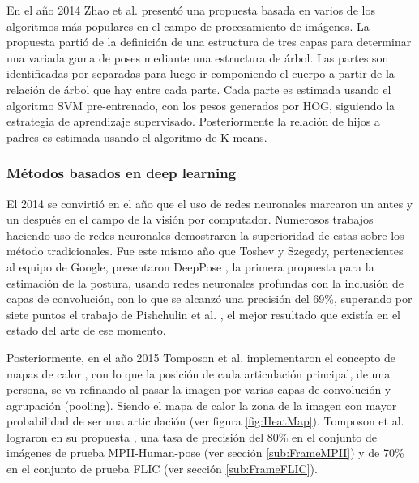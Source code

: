         En el año 2014 Zhao et al. \cite{Zhao2015} presentó una propuesta basada en varios de los algoritmos más populares en el campo de procesamiento de imágenes. La propuesta partió de la definición de una estructura de tres capas para determinar una variada gama de poses mediante una estructura de árbol. Las partes son identificadas por separadas para luego ir componiendo el cuerpo a partir de la relación de árbol que hay entre cada parte. Cada parte es estimada usando el algoritmo SVM pre-entrenado, con los pesos generados por HOG, siguiendo la estrategia de aprendizaje supervisado. Posteriormente la relación de hijos a padres es estimada usando el algoritmo de K-means.
        
        \subsubsection{Métodos basados en deep learning}
        \label{Sub2:FramePoseEstimationNN}

        El 2014 se convirtió en el año que el uso de redes neuronales marcaron un antes y un después en el campo de la visión por computador. Numerosos trabajos haciendo uso de redes neuronales demostraron la superioridad de estas sobre los método tradicionales. Fue este mismo año que Toshev y Szegedy, pertenecientes al equipo de Google, presentaron DeepPose \cite{Toshev2014}, la primera propuesta para la estimación de la postura, usando redes neuronales profundas con la inclusión de capas de convolución, con lo que se alcanzó una precisión del 69\%, superando por siete puntos el trabajo de Pishchulin et al. \cite{Pishchulin2013}, el mejor resultado que existía en el estado del arte de ese momento.

        Posteriormente, en el año 2015 Tomposon et al. implementaron el concepto de mapas de calor \cite{Tompson2015}, con lo que la posición de cada articulación principal, de una persona, se va refinando al pasar la imagen por varias capas de convolución y agrupación (pooling). Siendo el mapa de calor la zona de la imagen con mayor probabilidad de ser una articulación (ver figura \ref{fig:HeatMap}). Tomposon et al. lograron en su propuesta \cite{Tompson2015}, una tasa de precisión del 80\% en el conjunto de imágenes de prueba MPII-Human-pose \cite{MPII2014} (ver sección \ref{sub:FrameMPII}) y de 70\% en el conjunto de prueba FLIC \cite{FLIC2013} (ver sección \ref{sub:FrameFLIC}).
        
